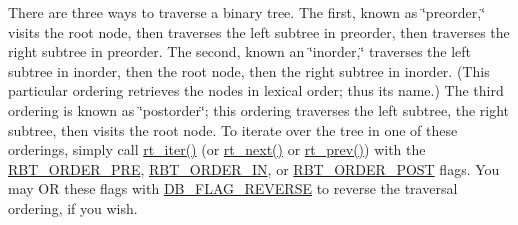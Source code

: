 There are three ways to traverse a binary tree. The first, known as \char`\"{}preorder,\char`\"{} visits the root node, then traverses the left subtree in preorder, then traverses the right subtree in preorder. The second, known an \char`\"{}inorder,\char`\"{} traverses the left subtree in inorder, then the root node, then the right subtree in inorder. (This particular ordering retrieves the nodes in lexical order; thus its name.) The third ordering is known as \char`\"{}postorder\char`\"{}; this ordering traverses the left subtree, the right subtree, then visits the root node. To iterate over the tree in one of these orderings, simply call \hyperlink{group__dbprim__rbtree_a11}{rt\_\-iter()} (or \hyperlink{group__dbprim__rbtree_a10}{rt\_\-next()} or \hyperlink{group__dbprim__rbtree_a24}{rt\_\-prev()}) with the \hyperlink{group__dbprim__rbtree_a21}{RBT\_\-ORDER\_\-PRE}, \hyperlink{group__dbprim__rbtree_a22}{RBT\_\-ORDER\_\-IN}, or \hyperlink{group__dbprim__rbtree_a23}{RBT\_\-ORDER\_\-POST} flags. You may OR these flags with \hyperlink{group__dbprim_a4}{DB\_\-FLAG\_\-REVERSE} to reverse the traversal ordering, if you wish. 

